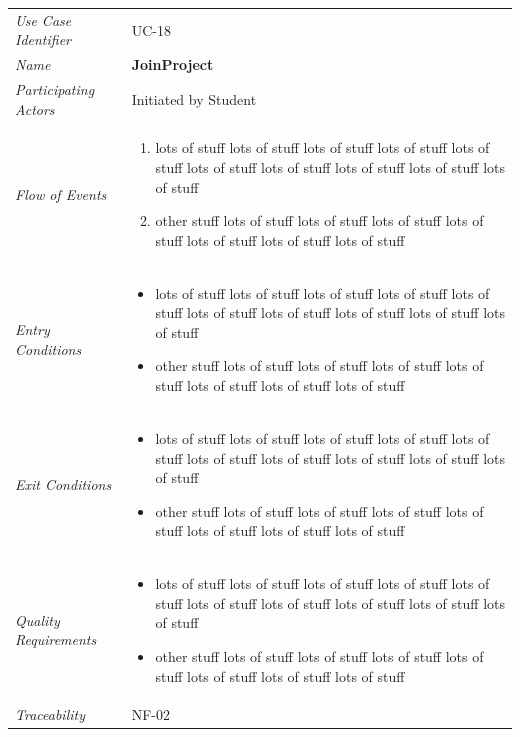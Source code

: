 \documentclass[12pt,letterpaper]{article}
\begin{document}
\begin{center}
	\begin{tabu} to 
		\toprule
		Use Case Identifier & UC-18 \\
		Name & {\bf JoinProject} \\
		Participating Actors & Initiated by Student \\
		Flow of Events & 
	    \begin{enumerate}[topsep=-1em]
		    \item lots of stuff lots of stuff lots of stuff lots of stuff lots of stuff lots of stuff lots of stuff lots of stuff lots of stuff lots of stuff
		    \item other stuff lots of stuff lots of stuff lots of stuff lots of stuff lots of stuff lots of stuff lots of stuff
		\end{enumerate} \\

		Entry Conditions &
		\begin{itemize}[topsep=-1em]
		    \item lots of stuff lots of stuff lots of stuff lots of stuff lots of stuff lots of stuff lots of stuff lots of stuff lots of stuff lots of stuff
		    \item other stuff lots of stuff lots of stuff lots of stuff lots of stuff lots of stuff lots of stuff lots of stuff
        \end{itemize} \\

		Exit Conditions &
		\begin{itemize}[topsep=-1em]
		    \item lots of stuff lots of stuff lots of stuff lots of stuff lots of stuff lots of stuff lots of stuff lots of stuff lots of stuff lots of stuff
		    \item other stuff lots of stuff lots of stuff lots of stuff lots of stuff lots of stuff lots of stuff lots of stuff
        \end{itemize} \\

		Quality Requirements &
		\begin{itemize}[topsep=-1em]
		    \item lots of stuff lots of stuff lots of stuff lots of stuff lots of stuff lots of stuff lots of stuff lots of stuff lots of stuff lots of stuff
		    \item other stuff lots of stuff lots of stuff lots of stuff lots of stuff lots of stuff lots of stuff lots of stuff
        \end{itemize} \\

		Traceability & NF-02 \\
		\toprule
	\end{tabu}
\end{center}
\end{document}
